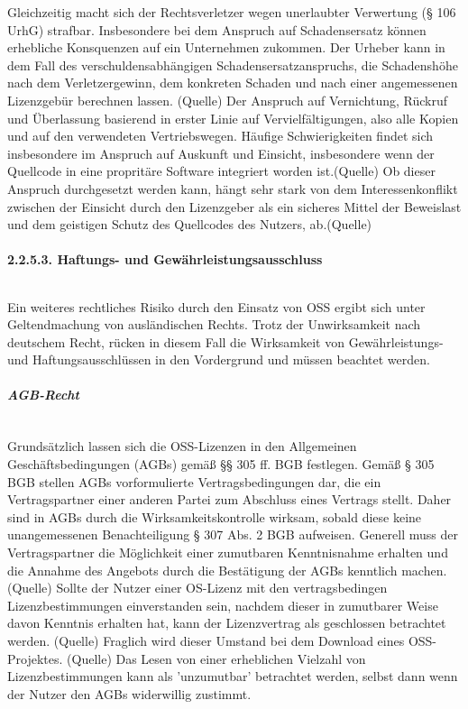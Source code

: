 Gleichzeitig macht sich der Rechtsverletzer wegen unerlaubter Verwertung (§ 106 UrhG) strafbar. Insbesondere bei dem Anspruch auf Schadensersatz können erhebliche Konsquenzen auf ein Unternehmen zukommen. Der Urheber kann in dem Fall des verschuldensabhängigen Schadensersatzanspruchs, die Schadenshöhe nach dem Verletzergewinn, dem konkreten Schaden und nach einer angemessenen Lizenzgebür berechnen lassen. (Quelle) Der Anspruch auf Vernichtung, Rückruf und Überlassung basierend in erster Linie auf Vervielfältigungen, also alle Kopien und auf den verwendeten Vertriebswegen. Häufige Schwierigkeiten findet sich insbesondere im Anspruch auf Auskunft und Einsicht, insbesondere wenn der Quellcode in eine propritäre Software integriert worden ist.(Quelle) Ob dieser Anspruch durchgesetzt werden kann, hängt sehr stark von dem Interessenkonflikt zwischen der Einsicht durch den Lizenzgeber als ein sicheres Mittel der Beweislast und dem geistigen Schutz des Quellcodes des Nutzers, ab.(Quelle)

\paragraph{2.2.5.3. Haftungs- und Gewährleistungsausschluss}$~$

Ein weiteres rechtliches Risiko durch den Einsatz von OSS ergibt sich unter Geltendmachung von ausländischen Rechts. Trotz der Unwirksamkeit nach deutschem Recht, rücken in diesem Fall die Wirksamkeit von Gewährleistungs- und Haftungsausschlüssen in den Vordergrund und müssen beachtet werden. 

\subparagraph{AGB-Recht}$~$

Grundsätzlich lassen sich die OSS-Lizenzen in den Allgemeinen Geschäftsbedingungen (AGBs) gemäß §§ 305 ff. BGB festlegen. Gemäß § 305 BGB stellen AGBs vorformulierte Vertragsbedingungen dar, die ein Vertragspartner einer anderen Partei zum Abschluss eines Vertrags stellt. Daher sind in AGBs durch die Wirksamkeitskontrolle wirksam, sobald diese keine unangemessenen Benachteiligung § 307 Abs. 2 BGB aufweisen. Generell muss der Vertragspartner die Möglichkeit einer zumutbaren Kenntnisnahme erhalten und die Annahme des Angebots durch die Bestätigung der AGBs kenntlich machen. (Quelle) Sollte der Nutzer einer OS-Lizenz mit den vertragsbedingen Lizenzbestimmungen einverstanden sein, nachdem dieser in zumutbarer Weise davon Kenntnis erhalten hat, kann der Lizenzvertrag als geschlossen betrachtet werden. (Quelle) Fraglich wird dieser Umstand bei dem Download eines OSS-Projektes. (Quelle) Das Lesen von einer erheblichen Vielzahl von Lizenzbestimmungen kann als 'unzumutbar' betrachtet werden, selbst dann wenn der Nutzer den AGBs widerwillig zustimmt.

